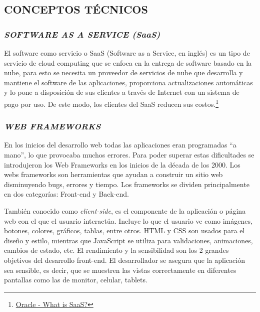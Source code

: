 
\subsection{CONCEPTOS TÉCNICOS}

\subsubsection{\textit{SOFTWARE AS A SERVICE (SaaS)}} 

El software como servicio o SaaS (Software as a Service, en inglés) es un tipo de servicio de cloud computing que se enfoca en la entrega de software basado en la nube, para esto se necesita un proveedor de servicios de nube que desarrolla y mantiene el software de las aplicaciones, proporciona actualizaciones automáticas y lo pone a disposición de sus clientes a través de Internet con un sistema de pago por uso. De este modo, los clientes del SaaS reducen sus costos.\footnote{\href{https://www.oracle.com/applications/what-is-saas/}{Oracle - What is SaaS?}}

\subsubsection{\textit{WEB FRAMEWORKS}}

En los inicios del desarrollo web todas las aplicaciones eran programadas “a mano”, lo que provocaba muchos errores. Para poder superar estas dificultades se introdujeron los Web Frameworks en los inicios de la década de los 2000. Los webs frameworks son herramientas que ayudan a construir un sitio web disminuyendo bugs, errores y tiempo. Los frameworks se dividen principalmente en dos categorías: Front-end y Back-end. \cite{analysiswf} 


También conocido como \textit{client-side}, es el componente de la aplicación o página web con el que el usuario interactúa. Incluye lo que el usuario ve como imágenes, botones, colores, gráficos, tablas, entre otros. HTML y CSS son usados para el diseño y estilo, mientras que JavaScript se utiliza para validaciones, animaciones, cambios de estado, etc. El rendimiento y la sensibilidad son los 2 grandes objetivos del desarrollo front-end. El desarrollador se asegura que la aplicación sea sensible, es decir, que se muestren las vistas correctamente en diferentes pantallas como las de monitor, celular, tablets. \cite{webframedbws}

